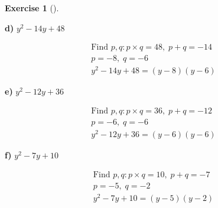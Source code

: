 \documentclass[
  letterpaper,
  DIV=11,
  numbers=noendperiod]{scrreprt}
\theoremstyle{definition}
\newtheorem{exercise}{Exercise}[chapter]
\theoremstyle{remark}
\begin{document}
\begin{exercise}[]
\begin{tcolorbox}
\textbf{d)} \(\displaystyle y^2 - 14y + 48\)

\begin{align*}
\text{Find } p, q: p \times q = 48,\; p + q = -14 \\ p = -8,\; q = -6 \\ y^2 - 14y + 48 = (y - 8)(y - 6)
\end{align*}

\textbf{e)} \(\displaystyle y^2 - 12y + 36\)

\begin{align*}
\text{Find } p, q: p \times q = 36,\; p + q = -12 \\ p = -6,\; q = -6 \\ y^2 - 12y + 36 = (y - 6)(y - 6)
\end{align*}

\textbf{f)} \(\displaystyle y^2 - 7y + 10\)

\begin{align*}
\text{Find } p, q: p \times q = 10,\; p + q = -7 \\ p = -5,\; q = -2 \\ y^2 - 7y + 10 = (y - 5)(y - 2)
\end{align*}

\end{tcolorbox}

\end{exercise}
\end{document}

